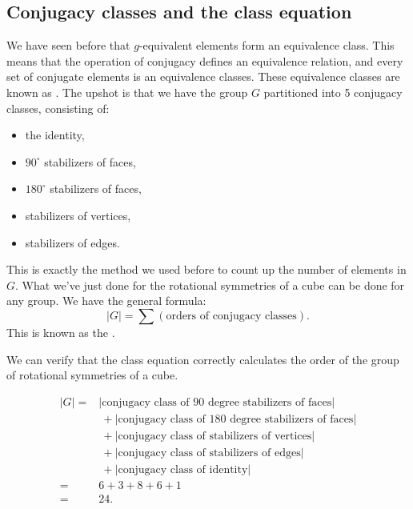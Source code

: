 
\subsection{Conjugacy classes and the class equation}

We have seen before that $g$-equivalent elements form an equivalence class. This means that the operation of conjugacy defines an equivalence relation, and every set of conjugate elements is an equivalence classes. These equivalence classes are known as .
The upshot is that we have the group $G$ partitioned into 5 conjugacy classes, consisting of: 
\begin{itemize}
\item
the identity, 
\item
 $90^{\circ}$ stabilizers of faces, 
\item
$180^{\circ}$ stabilizers of faces, 
\item
stabilizers of vertices, 
\item
stabilizers of edges. 
\end{itemize}

This is exactly the method we used before to count up the number of elements in $G$.  
What we've just done for the rotational symmetries of a cube can be done for any group.  We have the general formula:
$$|G| = \sum (\text{orders of conjugacy classes}).$$
This is known as the .

\begin{example}\label{example:actions:Conj15}
  We can verify that the class equation correctly calculates the order of the group of rotational symmetries of a cube. 

\begin{align*}
|G|=&|\text{conjugacy class of 90 degree stabilizers of faces}| \\
&~+|\text{conjugacy class of 180 degree stabilizers of faces}|\\
&~+|\text{conjugacy class of stabilizers of vertices}|\\
&~+|\text{conjugacy class of stabilizers of edges}|\\
&~+|\text{conjugacy class of identity}|\\
=&6+3+8+6+1\\
=&24.
\end{align*}
\end{example}

